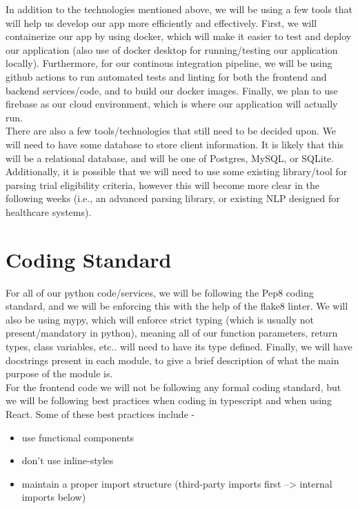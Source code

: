 \documentclass{article}
\begin{document}
In addition to the technologies mentioned above, we will be using a few tools that will help us 
develop our app more efficiently and effectively. First, we will containerize our app
by using docker, which will make it easier to test and deploy our application (also use of docker desktop for running/testing
our application locally). Furthermore, for our continous 
integration pipeline, we will be using github actions to run automated tests and linting for both the frontend and backend 
services/code, and to build our docker images. Finally, we plan to use firebase as our cloud environment, which
is where our application will actually run. \\

There are also a few tools/technologies that still need to be decided upon. We will need to have some database to store
client information. It is likely that this will be a relational database, and will be one of Postgres, MySQL, or SQLite.
Additionally, it is possible that we will need to use some existing library/tool for parsing trial eligibility criteria, however this 
will become more clear in the following weeks (i.e., an advanced parsing library, or existing NLP designed for healthcare systems).

\section{Coding Standard}

For all of our python code/services, we will be following the Pep8 coding standard, and we will be enforcing this 
with the help of the flake8 linter. We will also be using mypy, which will enforce strict typing (which is usually not present/mandatory
in python), meaning all of our function parameters, return types, class variables, etc.. will need to have its type defined. Finally, we will
have docstrings present in each module, to give a brief description of what the main purpose of the module is.\\

For the frontend code we will not be following any formal coding standard, but we will be following best practices
when coding in typescript and when using React. Some of these best practices include - 

\begin{itemize}
	\item use functional components
	\item don't use inline-styles
	\item maintain a proper import structure (third-party imports first --> internal imports below)
\end{itemize}
\end{document}
